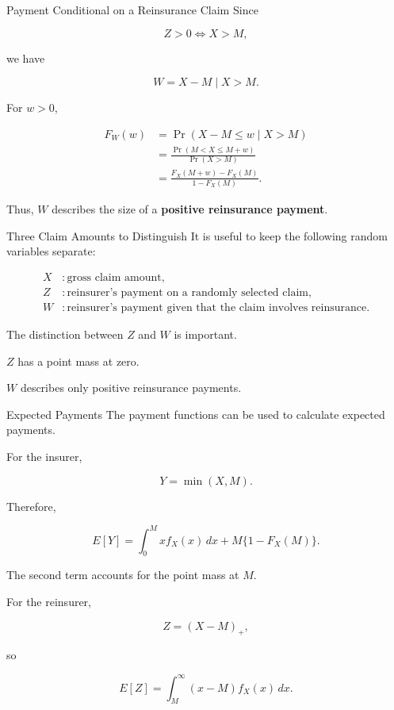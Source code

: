 \documentclass[
  ignorenonframetext,
  aspectratio=169,
]{beamer}
\begin{document}
\begin{frame}{Payment Conditional on a Reinsurance Claim}
\protect{}\label{payment-conditional-on-a-reinsurance-claim}
Since

\[
Z>0
\iff
X>M,
\]

we have

\[
W=X-M\mid X>M.
\]

For \(w>0\),

\[
\begin{aligned}
F_W(w)
&=\Pr(X-M\leq w\mid X>M)\\
&=\frac{\Pr(M<X\leq M+w)}
{\Pr(X>M)}\\
&=\frac{F_X(M+w)-F_X(M)}
{1-F_X(M)}.
\end{aligned}
\]

Thus, \(W\) describes the size of a \textbf{positive reinsurance
payment}.
\end{frame}

\begin{frame}{Three Claim Amounts to Distinguish}
\protect{}\label{three-claim-amounts-to-distinguish}
It is useful to keep the following random variables separate:

\[
\begin{aligned}
X &: \text{gross claim amount},\\
Z &: \text{reinsurer's payment on a randomly selected claim},\\
W &: \text{reinsurer's payment given that the claim involves reinsurance}.
\end{aligned}
\]

The distinction between \(Z\) and \(W\) is important.

\(Z\) has a point mass at zero.

\(W\) describes only positive reinsurance payments.
\end{frame}

\begin{frame}{Expected Payments}
\protect{}\label{expected-payments}
The payment functions can be used to calculate expected payments.

For the insurer,

\[
Y=\min(X,M).
\]

Therefore,

\[
E[Y]
=
\int_0^M x f_X(x)\,dx
+
M\{1-F_X(M)\}.
\]

The second term accounts for the point mass at \(M\).

For the reinsurer,

\[
Z=(X-M)_+,
\]

so

\[
\boxed{
E[Z]
=
\int_M^\infty (x-M)f_X(x)\,dx.
}
\]
\end{frame}
\end{document}
